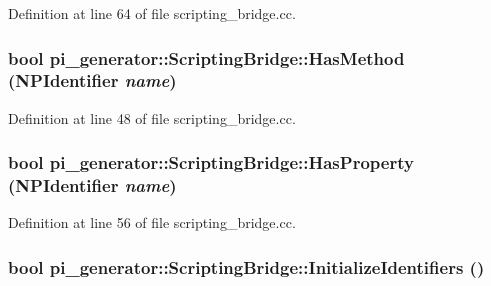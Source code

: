 Definition at line 64 of file scripting\_\-bridge.cc.

\hypertarget{classpi__generator_1_1_scripting_bridge_aaa99f91c8ced5df6fac0700516cdd058}{
\subsubsection[{HasMethod}]{\setlength{\rightskip}{0pt plus 5cm}bool pi\_\-generator::ScriptingBridge::HasMethod ({\bf NPIdentifier} {\em name})}}
\label{classpi__generator_1_1_scripting_bridge_aaa99f91c8ced5df6fac0700516cdd058}


Definition at line 48 of file scripting\_\-bridge.cc.

\hypertarget{classpi__generator_1_1_scripting_bridge_a55f52d9e5e377367881e919db10b019f}{
\subsubsection[{HasProperty}]{\setlength{\rightskip}{0pt plus 5cm}bool pi\_\-generator::ScriptingBridge::HasProperty ({\bf NPIdentifier} {\em name})}}
\label{classpi__generator_1_1_scripting_bridge_a55f52d9e5e377367881e919db10b019f}


Definition at line 56 of file scripting\_\-bridge.cc.

\hypertarget{classpi__generator_1_1_scripting_bridge_a76184c7bc22d728d207e275b5f980d67}{
\subsubsection[{InitializeIdentifiers}]{\setlength{\rightskip}{0pt plus 5cm}bool pi\_\-generator::ScriptingBridge::InitializeIdentifiers ()}}
\label{classpi__generator_1_1_scripting_bridge_a76184c7bc22d728d207e275b5f980d67}


